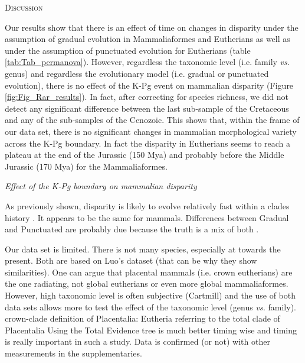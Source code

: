 \documentclass[12pt,letterpaper]{article}
\renewcommand{\section}[1]{%
\bigskip
\begin{center}
\begin{Large}
\normalfont\scshape #1
\medskip
\end{Large}
\end{center}}
\renewcommand{\subsection}[1]{%
\bigskip
\begin{center}
\begin{large}
\normalfont\itshape #1
\end{large}
\end{center}}
\begin{document}
\section{Discussion}
Our results show that there is an effect of time on changes in disparity under the assumption of gradual evolution in Mammaliaformes and Eutherians as well as under the assumption of punctuated evolution for Eutherians (table \ref{tab:Tab_permanova}).
However, regardless the taxonomic level (i.e. family \textit{vs.} genus) and regardless the evolutionary model (i.e. gradual or punctuated evolution), there is no effect of the K-Pg event on mammalian disparity (Figure \ref{fig:Fig_Rar_results}).
In fact, after correcting for species richness, we did not detect any significant difference between the last sub-sample of the Cretaceous and any of the sub-samples of the Cenozoic.
This shows that, within the frame of our data set, there is no significant changes in mammalian morphological variety across the K-Pg boundary.
In fact the disparity in Eutherians seems to reach a plateau at the end of the Jurassic (150 Mya) and probably before the Middle Jurassic (170 Mya) for the Mammaliaformes.

\subsection{Effect of the K-Pg boundary on mammalian disparity}
As previously shown, disparity is likely to evolve relatively fast within a clades history \cite{Hughes20082013}.
It appears to be the same for mammals.
Differences between Gradual and Punctuated are probably due because the truth is a mix of both \cite{Hunt21042015}.


Our data set is limited.
There is not many species, especially at towards the present.
Both are based on Luo's dataset (that can be why they show similarities).
One can argue that placental mammals (i.e. crown eutherians) are the one radiating, not global eutherians or even more global mammaliaformes.
However, high taxonomic level is often subjective (Cartmill) and the use of both data sets allows more to test the effect of the taxonomic level (genus \textit{vs.} family).
crown-clade definition of Placentalia: Eutheria referring to the total clade of Placentalia \citep{O'Leary08022013,beckancient2014}
Using the Total Evidence tree is much better timing wise and timing is really important in such a study.
Data is confirmed (or not) with other measurements in the supplementaries.
\end{document}
